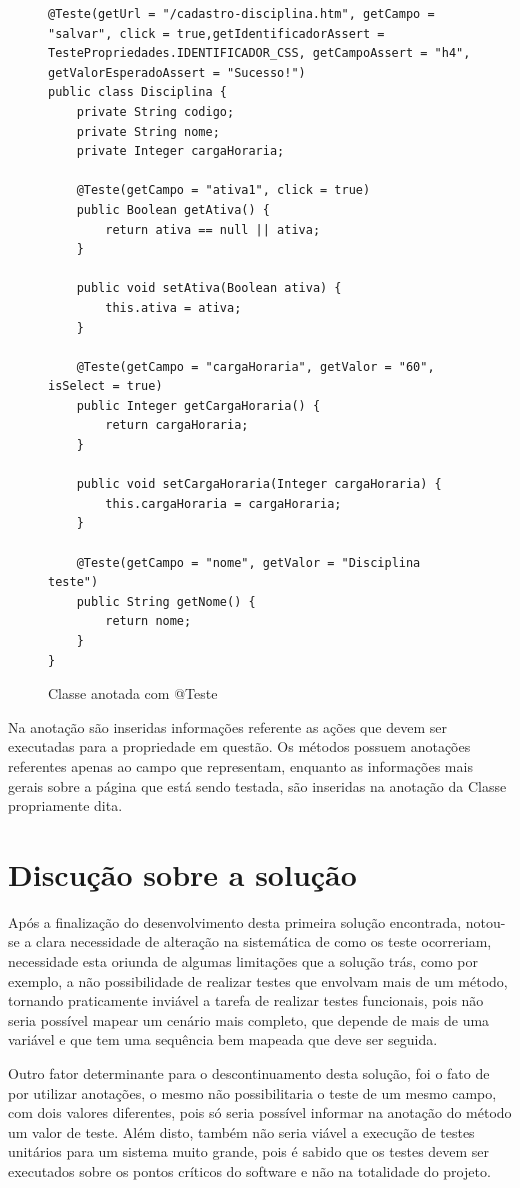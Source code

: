 \documentclass[tg]{mdtufsm}
\begin{document}
\begin{figure}[!htt]
\begin{lstlisting}
@Teste(getUrl = "/cadastro-disciplina.htm", getCampo = "salvar", click = true,getIdentificadorAssert = TestePropriedades.IDENTIFICADOR_CSS, getCampoAssert = "h4", getValorEsperadoAssert = "Sucesso!")
public class Disciplina {
    private String codigo;
    private String nome;
    private Integer cargaHoraria;

    @Teste(getCampo = "ativa1", click = true)
    public Boolean getAtiva() {
        return ativa == null || ativa;
    }

    public void setAtiva(Boolean ativa) {
        this.ativa = ativa;
    }

    @Teste(getCampo = "cargaHoraria", getValor = "60", isSelect = true)
    public Integer getCargaHoraria() {
        return cargaHoraria;
    }

    public void setCargaHoraria(Integer cargaHoraria) {
        this.cargaHoraria = cargaHoraria;
    }

    @Teste(getCampo = "nome", getValor = "Disciplina teste")
    public String getNome() {
        return nome;
    }
}
\end{lstlisting}
	\caption{Classe anotada com @Teste}
	\label{code:Disciplina.java}
\end{figure}

Na anotação são inseridas informações referente as ações que devem ser executadas para a propriedade em questão. Os métodos possuem anotações referentes apenas ao campo que representam, enquanto as informações mais gerais sobre
a página que está sendo testada, são inseridas na anotação da Classe propriamente dita.

\section{Discução sobre a solução}
Após a finalização do desenvolvimento desta primeira solução encontrada, notou-se a clara necessidade de alteração na sistemática de como os teste ocorreriam, necessidade esta oriunda de algumas limitações que a solução trás,
como por exemplo, a não possibilidade de realizar testes que envolvam mais de um método, tornando praticamente inviável a tarefa de realizar testes funcionais, pois não seria possível mapear um cenário mais completo, que depende
de mais de uma variável e que tem uma sequência bem mapeada que deve ser seguida.

Outro fator determinante para o descontinuamento desta solução, foi o fato de por utilizar anotações, o mesmo não possibilitaria o teste de um mesmo campo, com dois valores diferentes, pois só seria possível informar na anotação do
método um valor de teste. Além disto, também não seria viável a execução de testes unitários para um sistema muito grande, pois é sabido que os testes devem ser executados sobre os pontos críticos do software e não na totalidade do projeto.
\end{document}
